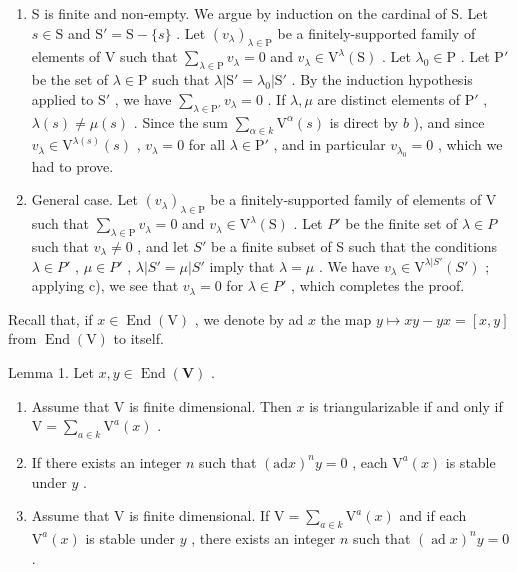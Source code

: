 \begin{enumerate}
\def\labelenumi{\alph{enumi})}
\setcounter{enumi}{2}
\item
  S is finite and non-empty. We argue by induction on the cardinal of S. Let \(s \in \mathrm{S}\) and \(\mathrm{S}' = \mathrm{S} - \{s\}\) . Let \((v_{\lambda})_{\lambda \in \mathrm{P}}\) be a finitely-supported family of elements of V such that \(\sum_{\lambda \in \mathrm{P}} v_{\lambda} = 0\) and \(v_{\lambda} \in \mathrm{V}^{\lambda}(\mathrm{S})\) . Let \(\lambda_0 \in \mathrm{P}\) . Let \(\mathrm{P}'\) be the set of \(\lambda \in \mathrm{P}\) such that \(\lambda |\mathrm{S}' = \lambda_0|\mathrm{S}'\) . By the induction hypothesis applied to \(\mathrm{S}'\) , we have \(\sum_{\lambda \in \mathrm{P}'} v_{\lambda} = 0\) . If \(\lambda, \mu\) are distinct elements of \(\mathrm{P}'\) , \(\lambda(s) \neq \mu(s)\) . Since the sum \(\sum_{\alpha \in k} \mathrm{V}^{\alpha}(s)\) is direct by \(b\) ), and since \(v_{\lambda} \in \mathrm{V}^{\lambda(s)}(s)\) , \(v_{\lambda} = 0\) for all \(\lambda \in \mathrm{P}'\) , and in particular \(v_{\lambda_0} = 0\) , which we had to prove.
\item
  General case. Let \((v_{\lambda})_{\lambda\in\mathrm{P}}\) be a finitely-supported family of elements of V such that \(\sum_{\lambda\in\mathrm{P}} v_{\lambda}=0\) and \(v_{\lambda}\in\mathrm{V}^{\lambda}(\mathrm{S})\) . Let \(P'\) be the finite set of \(\lambda\in P\) such that \(v_{\lambda}\neq0\) , and let \(S'\) be a finite subset of S such that the conditions \(\lambda\in P'\) , \(\mu\in P'\) , \(\lambda|S'= \mu|S'\) imply that \(\lambda=\mu\) . We have \(v_{\lambda}\in\mathrm{V}^{\lambda|S'}(S')\) ; applying c), we see that \(v_{\lambda}=0\) for \(\lambda\in P'\) , which completes the proof.
\end{enumerate}

Recall that, if \(x \in \operatorname{End}(\mathrm{V})\) , we denote by ad \(x\) the map \(y \mapsto xy - yx = [x, y]\) from \(\operatorname{End}(\mathrm{V})\) to itself.

Lemma 1. Let \(x, y \in \operatorname{End}(\mathbf{V})\) .

\begin{enumerate}
\def\labelenumi{(\roman{enumi})}
\item
  Assume that \(\mathrm{V}\) is finite dimensional. Then \(x\) is triangularizable if and only if \(\mathrm{V} = \sum_{a\in k}\mathrm{V}^a (x)\) .
\item
  If there exists an integer \(n\) such that \((\mathrm{ad}x)^n y = 0\) , each \(\mathrm{V}^a(x)\) is stable under \(y\) .
\item
  Assume that \(\mathrm{V}\) is finite dimensional. If \(\mathrm{V} = \sum_{a \in k} \mathrm{V}^a(x)\) and if each \(\mathrm{V}^a(x)\) is stable under \(y\) , there exists an integer \(n\) such that \((\operatorname{ad} x)^n y = 0\) .
\end{enumerate}

